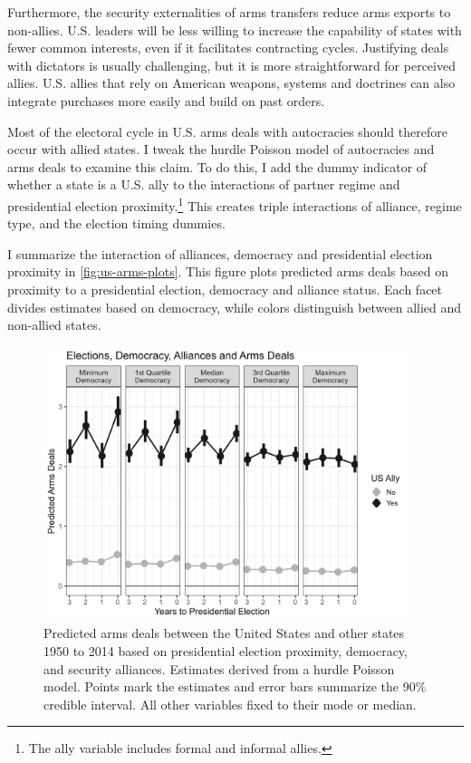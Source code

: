 \documentclass[12pt]{article}
\begin{document}
Furthermore, the security externalities of arms transfers reduce arms exports to non-allies. 
U.S. leaders will be less willing to increase the capability of states with fewer common interests, even if it facilitates contracting cycles.
Justifying deals with dictators is usually challenging, but it is more straightforward for perceived allies. 
U.S. allies that rely on American weapons, systems and doctrines can also integrate purchases more easily and build on past orders. 



Most of the electoral cycle in U.S. arms deals with autocracies should therefore occur with allied states. 
I tweak the hurdle Poisson model of autocracies and arms deals to examine this claim. 
To do this, I add the dummy indicator of whether a state is a U.S. ally to the interactions of partner regime and presidential election proximity.\footnote{The ally variable includes formal and informal allies.}
This creates triple interactions of alliance, regime type, and the election timing dummies. 


I summarize the interaction of alliances, democracy and presidential election proximity in \autoref{fig:us-arms-plots}.
This figure plots predicted arms deals based on proximity to a presidential election, democracy and alliance status. 
Each facet divides estimates based on democracy, while colors distinguish between allied and non-allied states. 


\begin{figure}[htpb]
	\centering
		\includegraphics[width=0.95\textwidth]{../figures/us-arms-plots.png}
	\caption{Predicted arms deals between the United States and other states 1950 to 2014 based on presidential election proximity, democracy, and security alliances. Estimates derived from a hurdle Poisson model. Points mark the estimates and error bars summarize the 90\% credible interval. All other variables fixed to their mode or median.}
	\label{fig:us-arms-plots}
\end{figure}
\end{document}
